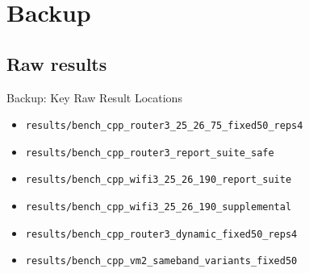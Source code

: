 \documentclass[aspectratio=169,11pt]{beamer}
\begin{document}
\appendix
\section{Backup}
\subsection{Raw results}

\begin{frame}{Backup: Key Raw Result Locations}
\small
\begin{itemize}
  \item \texttt{results/bench\_cpp\_router3\_25\_26\_75\_fixed50\_reps4}
  \item \texttt{results/bench\_cpp\_router3\_report\_suite\_safe}
  \item \texttt{results/bench\_cpp\_wifi3\_25\_26\_190\_report\_suite}
  \item \texttt{results/bench\_cpp\_wifi3\_25\_26\_190\_supplemental}
  \item \texttt{results/bench\_cpp\_router3\_dynamic\_fixed50\_reps4}
  \item \texttt{results/bench\_cpp\_vm2\_sameband\_variants\_fixed50}
\end{itemize}
\end{frame}
\end{document}
